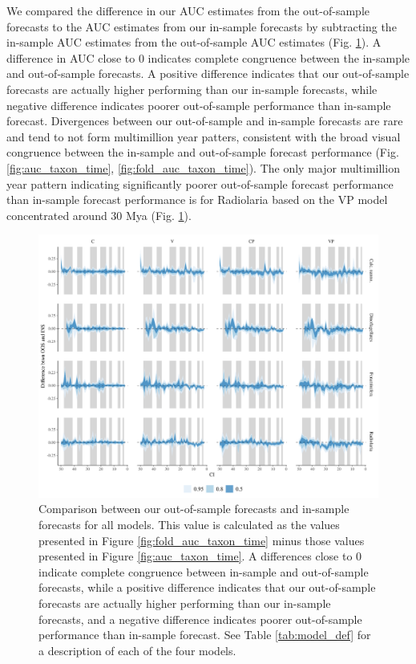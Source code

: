 \documentclass[12pt,letterpaper]{article}
\begin{document}
\begin{refsection}
We compared the difference in our AUC estimates from the out-of-sample forecasts to the AUC estimates from our in-sample forecasts by subtracting the in-sample AUC estimates from the out-of-sample AUC estimates (Fig. \ref{fig:oos_ins_diff}). A difference in AUC close to 0 indicates complete congruence between the in-sample and out-of-sample forecasts. A positive difference indicates that our out-of-sample forecasts are actually higher performing than our in-sample forecasts, while negative difference indicates poorer out-of-sample performance than in-sample forecast. Divergences between our out-of-sample and in-sample forecasts are rare and tend to not form multimillion year patters, consistent with the broad visual congruence between the in-sample and out-of-sample forecast performance (Fig. \ref{fig:auc_taxon_time}, \ref{fig:fold_auc_taxon_time}). The only major multimillion year pattern indicating significantly poorer out-of-sample forecast performance than in-sample forecast performance is for Radiolaria based on the VP model concentrated around 30 Mya (Fig. \ref{fig:oos_ins_diff}).

\begin{figure}[ht]
 \centering
 \includegraphics[width=\textwidth,height=0.5\textheight,keepaspectratio=true]{../results/figure/auc_diff}
 \caption{Comparison between our out-of-sample forecasts and in-sample forecasts for all models. This value is calculated as the values presented in Figure \ref{fig:fold_auc_taxon_time} minus those values presented in Figure \ref{fig:auc_taxon_time}. A differences close to 0 indicate complete congruence between in-sample and out-of-sample forecasts, while a positive difference indicates that our out-of-sample forecasts are actually higher performing than our in-sample forecasts, and a negative difference indicates poorer out-of-sample performance than in-sample forecast. See Table \ref{tab:model_def} for a description of each of the four models.}
 \label{fig:oos_ins_diff}
\end{figure}




\end{refsection}
\end{document}
